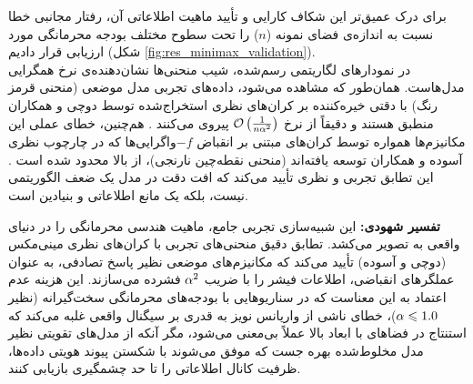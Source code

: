 برای درک عمیق‌تر این شکاف کارایی و تأیید ماهیت اطلاعاتی آن، رفتار مجانبی خطا نسبت به اندازه‌ی فضای نمونه ($n$) را تحت سطوح مختلف بودجه محرمانگی مورد ارزیابی قرار دادیم (شکل \ref{fig:res_minimax_validation}). \\
در نمودارهای لگاریتمی رسم‌شده، شیب منحنی‌ها نشان‌دهنده‌ی نرخ همگرایی مدل‌هاست. همان‌طور که مشاهده می‌شود، داده‌های تجربی مدل موضعی (منحنی قرمز رنگ) با دقتی خیره‌کننده بر کران‌های نظری استخراج‌شده توسط دوچی و همکاران منطبق هستند و دقیقاً از نرخ $\mathcal{O}\left( \frac{1}{n \alpha^2} \right)$ پیروی می‌کنند \cite{Duchi2013}. هم‌چنین، خطای عملی این مکانیزم‌ها همواره توسط کران‌های مبتنی بر انقباض $-f$واگرایی‌ها که در چارچوب نظری آسوده و همکاران توسعه یافته‌اند (منحنی نقطه‌چین نارنجی)، از بالا محدود شده است \cite{Asoodeh2024}. این تطابق تجربی و نظری تأیید می‌کند که افت دقت در مدل  یک ضعف الگوریتمی نیست، بلکه یک مانع اطلاعاتی و بنیادین است.

\textbf{تفسیر شهودی:} این شبیه‌سازی تجربی جامع، ماهیت هندسی محرمانگی را در دنیای واقعی به تصویر می‌کشد. تطابق دقیق منحنی‌های تجربی  با کران‌های نظری مینی‌مکس (دوچی و آسوده) تأیید می‌کند که مکانیزم‌های موضعی نظیر پاسخ تصادفی، به عنوان عملگرهای انقباضی، اطلاعات فیشر را با ضریب $\alpha^2$ فشرده می‌سازند. این هزینه عدم اعتماد به این معناست که در سناریوهایی با بودجه‌های محرمانگی سخت‌گیرانه (نظیر $\alpha \leqslant 1.0$)، خطای ناشی از واریانس نویز به قدری بر سیگنال واقعی غلبه می‌کند که استنتاج در فضاهای با ابعاد بالا عملاً بی‌معنی می‌شود، مگر آنکه از مدل‌های تقویتی نظیر مدل مخلوط‌شده بهره جست که موفق می‌شوند با شکستن پیوند هویتی داده‌ها، ظرفیت کانال اطلاعاتی را تا حد چشمگیری بازیابی کنند.




